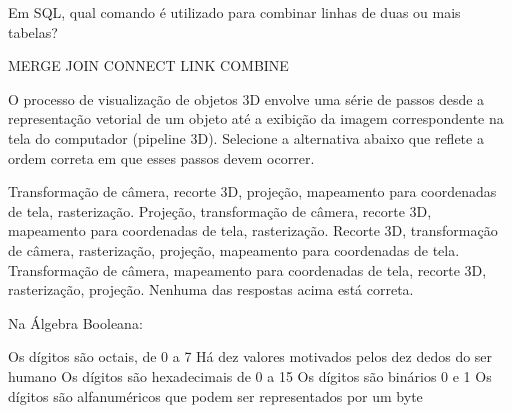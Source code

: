 \documentclass[12pt, addpoints]{exam}
\begin{document}
\begin{questions}
\question
Em SQL, qual comando é utilizado para combinar linhas de duas ou mais tabelas?

\begin{choices}
\choice MERGE
\choice JOIN
\choice CONNECT
\choice LINK
\choice COMBINE
\end{choices}

\question
O processo de visualização de objetos 3D envolve uma série de passos desde a representação vetorial de um objeto até a exibição da imagem correspondente na tela do computador (pipeline 3D). Selecione a alternativa abaixo que reflete a ordem correta em que esses passos devem ocorrer. 
\begin{choices}
\choice Transformação de câmera, recorte 3D, projeção, mapeamento para coordenadas de tela, rasterização. 
\choice Projeção, transformação de câmera, recorte 3D, mapeamento para coordenadas de tela, rasterização. 
\choice Recorte 3D, transformação de câmera, rasterização, projeção, mapeamento para coordenadas de tela. 
\choice Transformação de câmera, mapeamento para coordenadas de tela, recorte 3D, rasterização, projeção. 
\choice Nenhuma das respostas acima está correta.
\end{choices}

\question
Na Álgebra Booleana:
\begin{choices}
\choice Os dígitos são octais, de 0 a 7
\choice Há dez valores motivados pelos dez dedos do ser humano
\choice Os dígitos são hexadecimais de 0 a 15
\choice Os dígitos são binários 0 e 1
\choice Os dígitos são alfanuméricos que podem ser representados por um byte
\end{choices}


\end{questions}
\end{document}
